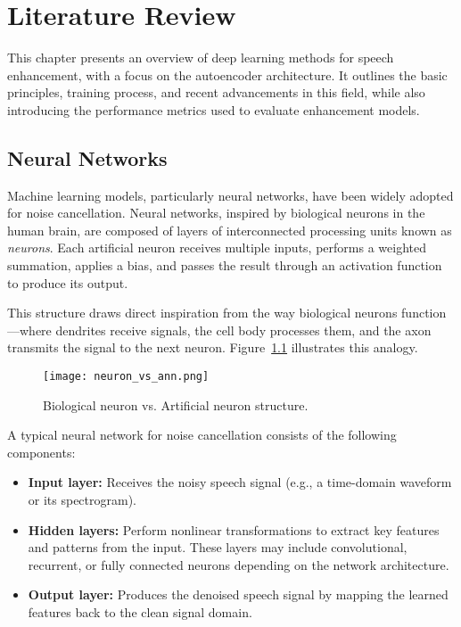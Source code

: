 \graphicspath{{content/chapters/3_literature/figures/}}
\chapter{Literature Review}
\label{sec:literature_review}

This chapter presents an overview of deep learning methods for speech enhancement, with a focus on the autoencoder architecture. It outlines the basic principles, training process, and recent advancements in this field, while also introducing the performance metrics used to evaluate enhancement models.


\section{Neural Networks}
\label{sec:neural_networks}

Machine learning models, particularly neural networks, have been widely adopted for noise cancellation. Neural networks, inspired by biological neurons in the human brain, are composed of layers of interconnected processing units known as \textit{neurons}. Each artificial neuron receives multiple inputs, performs a weighted summation, applies a bias, and passes the result through an activation function to produce its output.

This structure draws direct inspiration from the way biological neurons function—where dendrites receive signals, the cell body processes them, and the axon transmits the signal to the next neuron. Figure~\ref{fig:neuron_vs_ann} illustrates this analogy.

\begin{figure}[H]
    \centering
    \texttt{[image: neuron\_vs\_ann.png]}
    \caption{Biological neuron vs. Artificial neuron structure.\cite{ghosh2020perceptron}}
    \label{fig:neuron_vs_ann}
\end{figure}

A typical neural network for noise cancellation consists of the following components:
\begin{itemize}
    \item \textbf{Input layer:} Receives the noisy speech signal (e.g., a time-domain waveform or its spectrogram).
    \item \textbf{Hidden layers:} Perform nonlinear transformations to extract key features and patterns from the input. These layers may include convolutional, recurrent, or fully connected neurons depending on the network architecture.
    \item \textbf{Output layer:} Produces the denoised speech signal by mapping the learned features back to the clean signal domain.
\end{itemize}

